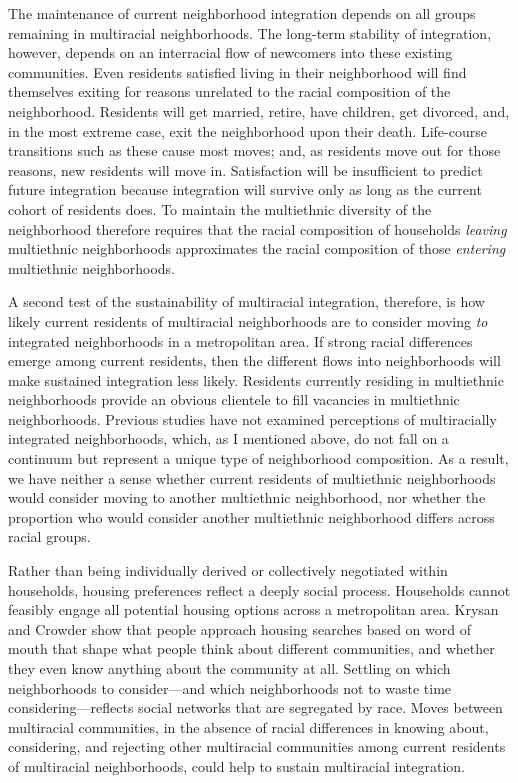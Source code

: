 \documentclass{baderart}
\begin{document}
The maintenance of current neighborhood integration depends on all groups remaining in multiracial neighborhoods. The long-term stability of integration, however, depends on an interracial flow of newcomers into these existing communities. Even residents satisfied living in their neighborhood will find themselves exiting for reasons unrelated to the racial composition of the neighborhood. Residents will get married, retire, have children, get divorced, and, in the most extreme case, exit the neighborhood upon their death. Life-course transitions such as these cause most moves; and, as residents move out for those reasons, new residents will move in. Satisfaction will be insufficient to predict future integration because integration will survive only as long as the current cohort of residents does. To maintain the multiethnic diversity of the neighborhood therefore requires that the racial composition of households \emph{leaving} multiethnic neighborhoods approximates the racial composition of those \emph{entering} multiethnic neighborhoods.

A second test of the sustainability of multiracial integration, therefore, is how likely current residents of multiracial neighborhoods are to consider moving \emph{to} integrated neighborhoods in a metropolitan area. If strong racial differences emerge among current residents, then the different flows into neighborhoods will make sustained integration less likely. Residents currently residing in multiethnic neighborhoods provide an obvious clientele to fill vacancies in multiethnic neighborhoods. Previous studies have not examined perceptions of multiracially integrated neighborhoods, which, as I mentioned above, do not fall on a continuum but represent a unique type of neighborhood composition. As a result, we have neither a sense whether current residents of multiethnic neighborhoods would consider moving to another multiethnic neighborhood, nor whether the proportion who would consider another multiethnic neighborhood differs across racial groups.

Rather than being individually derived or collectively negotiated within households, housing preferences reflect a deeply social process. Households cannot feasibly engage all potential housing options across a metropolitan area. Krysan and Crowder \citeyearpar{krysan_cycle_2017} show that people approach housing searches based on word of mouth that shape what people think about different communities, and whether they even know anything about the community at all. Settling on which neighborhoods to consider---and which neighborhoods not to waste time considering---reflects social networks that are segregated by race.  Moves between multiracial communities, in the absence of racial differences in knowing about, considering, and rejecting other multiracial communities among current residents of multiracial neighborhoods, could help to sustain multiracial integration. 
\end{document}
